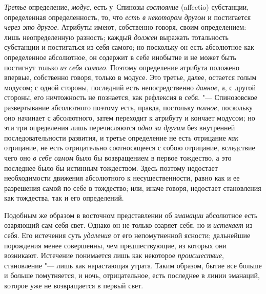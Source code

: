 {\em Третье} определение,
{\em модус}, есть у~Спинозы
{\em состояние} (affectio) субстанции, определенная
определенность, то, что {\em есть в некотором другом} и
постигается {\em через это другое}. Атрибуты имеют,
собственно говоря, своим определением: лишь неопределенную разность; каждый
{\em должен} выражать тотальность субстанции и
постигаться из себя самого; но поскольку он есть абсолютное как
определенное абсолютное, он содержит в себе инобытие и не может быть
постигнут только {\em из себя самого}. Поэтому
определение атрибута положено впервые, собственно говоря, только в модусе.
Это третье, далее, остается голым модусом; с одной стороны, последний есть
непосредственно {\em данное}, а, с другой стороны, его
ничтожность не познается, как рефлексия в себя. "--- Спинозовское
развертывание абсолютного поэтому есть, правда, постольку
{\em полное}, поскольку оно начинает с абсолютного,
затем переходит к атрибуту и кончает модусом; но эти три определения лишь
перечисляются {\em одно за другим} без внутренней
последовательности развития, и третье определение не есть отрицание
{\em как} отрицание, не есть отрицательно соотносящееся
с собою отрицание, вследствие чего оно {\em в себе
самом} было бы возвращением в первое тождество, а это последнее было бы
истинным тождеством. Здесь поэтому недостает необходимости движения
абсолютного к несущественности, равно как и ее разрешения самой по себе в
тождество; или, иначе говоря, недостает становления как тождества, так и
его определений.

Подобным же образом в восточном представлении об
{\em эманации} абсолютное есть озаряющий сам себя свет.
Однако он не только озаряет себя, но и {\em истекает}
из себя. Его истечения суть {\em удаления} от его
непомутненной ясности; дальнейшие порождения менее совершенны, чем
предшествующие, из которых они возникают. Истечение понимается лишь как
некоторое {\em происшествие}, становление "--- лишь как
нарастающая утрата. Таким образом, бытие все больше и больше помутняется, и
ночь, отрицательное, есть последнее в линии эманаций, которое уже не
возвращается в первый свет.

